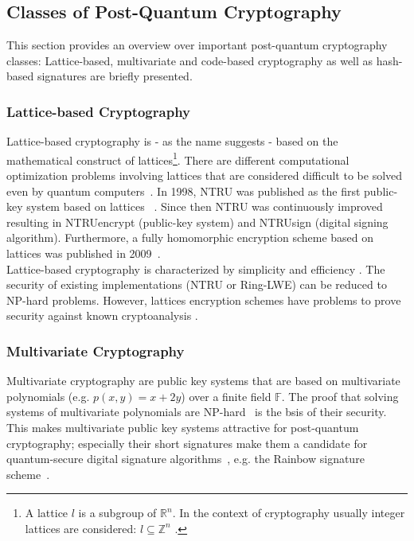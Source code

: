 \subsection{Classes of Post-Quantum Cryptography} \label{sec:classes_pqc}

This section provides an overview over important post-quantum cryptography classes: Lattice-based, multivariate and code-based cryptography as well as hash-based signatures are briefly presented. 

\subsubsection{Lattice-based Cryptography}
Lattice-based cryptography is - as the name suggests - based on the mathematical construct of lattices\footnote{A lattice $l$ is a subgroup of $\mathbb{R}^n$. In the context of cryptography usually integer lattices are considered: $l \subseteq \mathbb{Z}^n$ \parencite{chi2015lattice}.}. There are different computational optimization problems involving lattices that are considered difficult to be solved even by quantum computers~\parencite{chi2015lattice}. In 1998, \gls{NTRU} was published as the first public-key system based on lattices ~\parencite{hoffstein1998ntru}. Since then \gls{NTRU} was continuously improved resulting in NTRUencrypt (public-key system) and \gls{NTRUsign} (digital signing algorithm). Furthermore, a fully homomorphic encryption scheme based on lattices was published in 2009~\parencite{gentry2009fully}.\\
Lattice-based cryptography is characterized by simplicity and efficiency \parencite{chen2016report}. The security of existing implementations (\gls{NTRU} or Ring-LWE) can be reduced to NP-hard problems. However, lattices encryption schemes have problems to prove security against known cryptoanalysis \parencite{chen2016report}.
\subsubsection{Multivariate Cryptography}
Multivariate cryptography are public key systems that are based on multivariate polynomials (e.g. $p(x,y)=x+2y$) over a finite field $\mathbb{F}$. The proof that solving systems of multivariate polynomials are NP-hard~\parencite{hartmanis1982computers} is the bsis of their security. This makes multivariate public key systems attractive for post-quantum cryptography; especially their short signatures make them a candidate for quantum-secure digital signature algorithms~\parencite{ding2017current}, e.g. the Rainbow signature scheme~\parencite{ding2005rainbow}.
